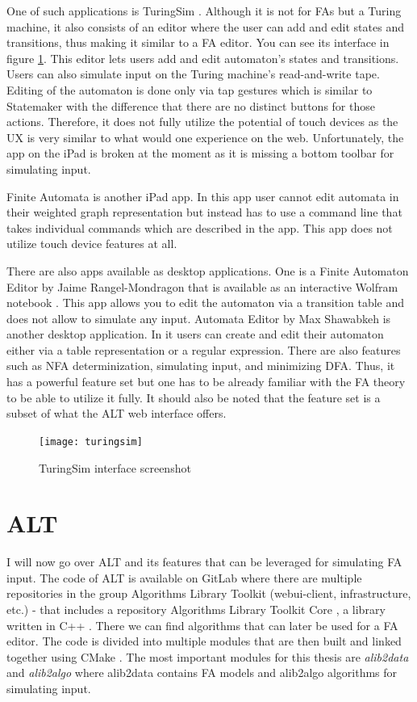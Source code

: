 One of such applications is TuringSim \cite{turingsim}. Although it is not for FAs but a Turing machine, it also consists of an editor where the user can add and edit states and transitions, thus making it similar to a FA editor. You can see its interface in figure \ref{turingsim-screen}. This editor lets users add and edit automaton's states and transitions. Users can also simulate input on the Turing machine's read-and-write tape. Editing of the automaton is done only via tap gestures which is similar to Statemaker with the difference that there are no distinct buttons for those actions. Therefore, it does not fully utilize the potential of touch devices as the UX is very similar to what would one experience on the web. Unfortunately, the app on the iPad is broken at the moment as it is missing a bottom toolbar for simulating input.

Finite Automata \cite{finite-automata-app} is another iPad app. In this app user cannot edit automata in their weighted graph representation but instead has to use a command line that takes individual commands which are described in the app. This app does not utilize touch device features at all.

There are also apps available as desktop applications. One is a Finite Automaton Editor by Jaime Rangel-Mondragon that is available as an interactive Wolfram notebook \cite{wolfram-editor}. This app allows you to edit the automaton via a transition table and does not allow to simulate any input. Automata Editor by Max Shawabkeh \cite{automata-editor-max} is another desktop application. In it users can create and edit their automaton either via a table representation or a regular expression. There are also features such as NFA determinization, simulating input, and minimizing DFA. Thus, it has a powerful feature set but one has to be already familiar with the FA theory to be able to utilize it fully. It should also be noted that the feature set is a subset of what the ALT web interface offers.

\begin{figure}
    \texttt{[image: turingsim]}
    \caption{TuringSim interface screenshot}\label{turingsim-screen}
\end{figure}

\section{ALT}

I will now go over ALT and its features that can be leveraged for simulating FA input. The code of ALT is available on GitLab \cite{gitlab} where there are multiple repositories in the group Algorithms Library Toolkit (webui-client, infrastructure, etc.) - that includes a repository Algorithms Library Toolkit Core \cite{alt-code}, a library written in C++ \cite{c++}. There we can find algorithms that can later be used for a FA editor. The code is divided into multiple modules that are then built and linked together using CMake \cite{cmake}. The most important modules for this thesis are \textit{alib2data} and \textit{alib2algo} where alib2data contains FA models and alib2algo algorithms for simulating input.

